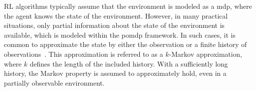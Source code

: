 RL algorithms typically assume that the environment is modeled as a \gls{mdp}, where the agent knows the state of the environment. However, in many practical situations, only partial information about the state of the environment is available, which is modeled within the \gls{pomdp} framework. In such cases, it is common to approximate the state by either the observation or a finite history of observations~\cite[Ch. 17]{Sutton2018}. This approximation is referred to as a $k$-Markov approximation, where $k$ defines the length of the included history. With a sufficiently long history, the Markov property is assumed to approximately hold, even in a partially observable environment.




